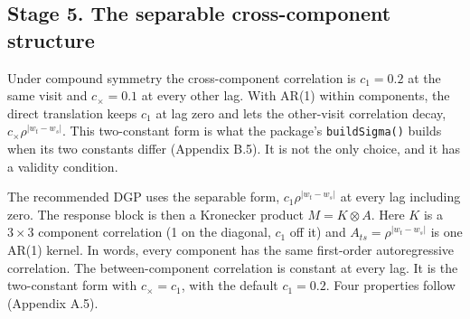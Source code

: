 \documentclass[
  11pt,
]{article}
\begin{document}
\subsection{Stage 5. The separable cross-component structure}\label{stage-5.-the-separable-cross-component-structure}

Under compound symmetry the cross-component correlation is
\(c_1 = 0.2\) at the same visit and \(c_\times = 0.1\) at every other lag.
With AR(1) within components, the direct translation keeps \(c_1\)
at lag zero and lets the other-visit correlation decay,
\(c_\times\rho^{\lvert w_t - w_s\rvert}\). This two-constant form is what
the package's \texttt{buildSigma()} builds when its two constants differ
(Appendix B.5). It is not the only choice, and it has a validity
condition.

The recommended DGP uses the separable form,
\(c_1\rho^{\lvert w_t - w_s\rvert}\) at every lag including zero. The
response block is then a Kronecker product \(M = K \otimes A\). Here \(K\)
is a \(3 \times 3\) component correlation (1 on the diagonal, \(c_1\) off
it) and \(A_{ts} = \rho^{\lvert w_t - w_s\rvert}\) is one AR(1) kernel.
In words, every component has the same first-order autoregressive
correlation. The between-component correlation is constant at every
lag. It is the two-constant form with \(c_\times = c_1\), with the
default \(c_1 = 0.2\). Four properties follow (Appendix A.5).
\end{document}
